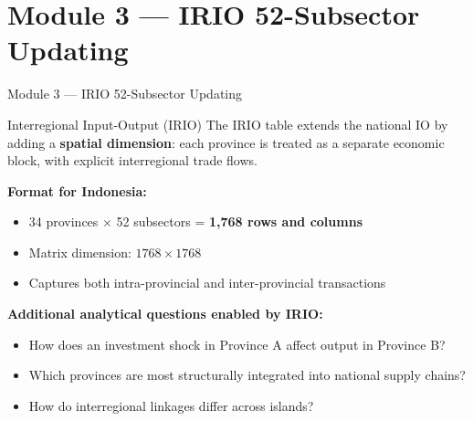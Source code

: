 \documentclass[aspectratio=169]{beamer}
\begin{document}
\section{Module 3 --- IRIO 52-Subsector Updating}

\begin{frame}{Module 3 --- IRIO 52-Subsector Updating}
\tableofcontents[currentsection]
\end{frame}

\begin{frame}{Interregional Input-Output (IRIO)}
The IRIO table extends the national IO by adding a \textbf{spatial dimension}: each province is treated as a separate economic block, with explicit interregional trade flows.

\medskip
\textbf{Format for Indonesia:}
\begin{itemize}
  \item 34 provinces $\times$ 52 subsectors = \textbf{1,768 rows and columns}
  \item Matrix dimension: $1768 \times 1768$
  \item Captures both intra-provincial and inter-provincial transactions
\end{itemize}

\medskip
\textbf{Additional analytical questions enabled by IRIO:}
\begin{itemize}
  \item How does an investment shock in Province A affect output in Province B?
  \item Which provinces are most structurally integrated into national supply chains?
  \item How do interregional linkages differ across islands?
\end{itemize}
\end{frame}
\end{document}
